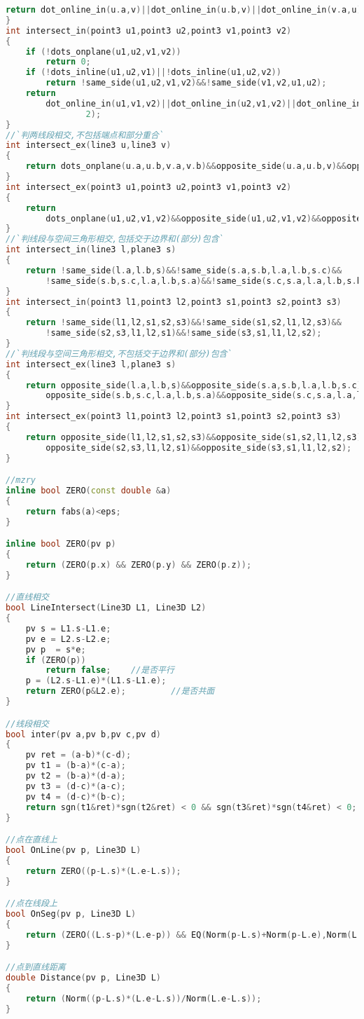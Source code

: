 \begin{lstlisting}[language=C++]
    return dot_online_in(u.a,v)||dot_online_in(u.b,v)||dot_online_in(v.a,u)||dot_online_in(v.b,u);
}
int intersect_in(point3 u1,point3 u2,point3 v1,point3 v2)
{
    if (!dots_onplane(u1,u2,v1,v2))
        return 0;
    if (!dots_inline(u1,u2,v1)||!dots_inline(u1,u2,v2))
        return !same_side(u1,u2,v1,v2)&&!same_side(v1,v2,u1,u2);
    return
        dot_online_in(u1,v1,v2)||dot_online_in(u2,v1,v2)||dot_online_in(v1,u1,u2)||dot_online_in(v2,u1,u
                2);
}
//`判两线段相交,不包括端点和部分重合`
int intersect_ex(line3 u,line3 v)
{
    return dots_onplane(u.a,u.b,v.a,v.b)&&opposite_side(u.a,u.b,v)&&opposite_side(v.a,v.b,u);
}
int intersect_ex(point3 u1,point3 u2,point3 v1,point3 v2)
{
    return
        dots_onplane(u1,u2,v1,v2)&&opposite_side(u1,u2,v1,v2)&&opposite_side(v1,v2,u1,u2);
}
//`判线段与空间三角形相交,包括交于边界和(部分)包含`
int intersect_in(line3 l,plane3 s)
{
    return !same_side(l.a,l.b,s)&&!same_side(s.a,s.b,l.a,l.b,s.c)&&
        !same_side(s.b,s.c,l.a,l.b,s.a)&&!same_side(s.c,s.a,l.a,l.b,s.b);
}
int intersect_in(point3 l1,point3 l2,point3 s1,point3 s2,point3 s3)
{
    return !same_side(l1,l2,s1,s2,s3)&&!same_side(s1,s2,l1,l2,s3)&&
        !same_side(s2,s3,l1,l2,s1)&&!same_side(s3,s1,l1,l2,s2);
}
//`判线段与空间三角形相交,不包括交于边界和(部分)包含`
int intersect_ex(line3 l,plane3 s)
{
    return opposite_side(l.a,l.b,s)&&opposite_side(s.a,s.b,l.a,l.b,s.c)&&
        opposite_side(s.b,s.c,l.a,l.b,s.a)&&opposite_side(s.c,s.a,l.a,l.b,s.b);
}
int intersect_ex(point3 l1,point3 l2,point3 s1,point3 s2,point3 s3)
{
    return opposite_side(l1,l2,s1,s2,s3)&&opposite_side(s1,s2,l1,l2,s3)&&
        opposite_side(s2,s3,l1,l2,s1)&&opposite_side(s3,s1,l1,l2,s2);
}

//mzry
inline bool ZERO(const double &a)
{
    return fabs(a)<eps;
}

inline bool ZERO(pv p)
{ 
    return (ZERO(p.x) && ZERO(p.y) && ZERO(p.z)); 
} 

//直线相交
bool LineIntersect(Line3D L1, Line3D L2) 
{ 
    pv s = L1.s-L1.e; 
    pv e = L2.s-L2.e; 
    pv p  = s*e; 
    if (ZERO(p)) 
        return false;    //是否平行 
    p = (L2.s-L1.e)*(L1.s-L1.e); 
    return ZERO(p&L2.e);         //是否共面 
} 

//线段相交
bool inter(pv a,pv b,pv c,pv d)
{
    pv ret = (a-b)*(c-d);
    pv t1 = (b-a)*(c-a);
    pv t2 = (b-a)*(d-a);
    pv t3 = (d-c)*(a-c);
    pv t4 = (d-c)*(b-c);
    return sgn(t1&ret)*sgn(t2&ret) < 0 && sgn(t3&ret)*sgn(t4&ret) < 0;
}

//点在直线上
bool OnLine(pv p, Line3D L)
{ 
    return ZERO((p-L.s)*(L.e-L.s)); 
} 

//点在线段上
bool OnSeg(pv p, Line3D L)
{ 
    return (ZERO((L.s-p)*(L.e-p)) && EQ(Norm(p-L.s)+Norm(p-L.e),Norm(L.e-L.s))); 
} 

//点到直线距离
double Distance(pv p, Line3D L)
{ 
    return (Norm((p-L.s)*(L.e-L.s))/Norm(L.e-L.s)); 
} 
\end{lstlisting}
